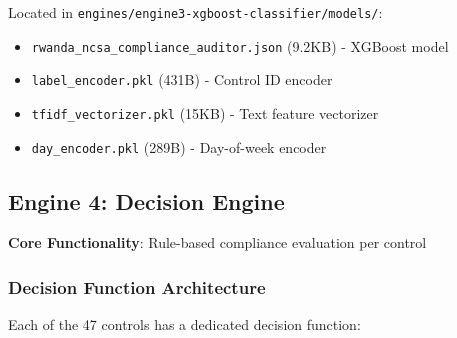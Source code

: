 \documentclass[11pt,conference]{IEEEtran}
\begin{document}
Located in \texttt{engines/engine3-xgboost-classifier/models/}:
\begin{itemize}
    \item \texttt{rwanda\_ncsa\_compliance\_auditor.json} (9.2KB) - XGBoost model
    \item \texttt{label\_encoder.pkl} (431B) - Control ID encoder
    \item \texttt{tfidf\_vectorizer.pkl} (15KB) - Text feature vectorizer
    \item \texttt{day\_encoder.pkl} (289B) - Day-of-week encoder
\end{itemize}

\subsection{Engine 4: Decision Engine}

\textbf{Core Functionality}: Rule-based compliance evaluation per control

\subsubsection{Decision Function Architecture}

Each of the 47 controls has a dedicated decision function:
\end{document}

